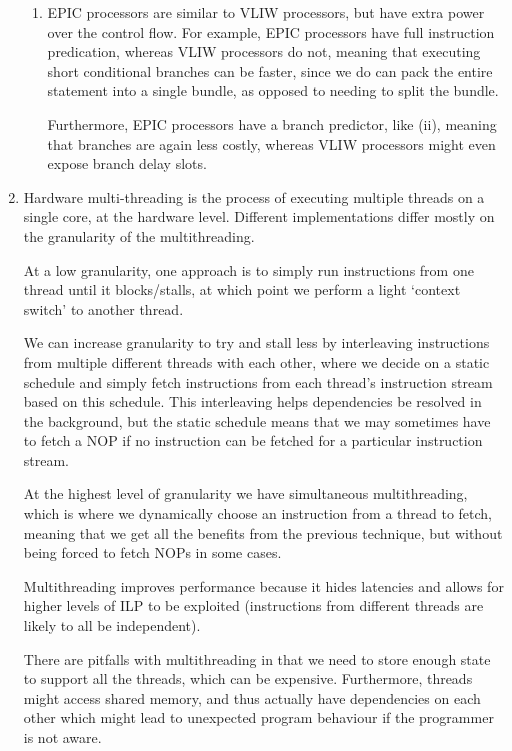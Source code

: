 \begin{enumerate}[label=(\alph*)]
\begin{enumerate}[label=(\roman*)]
            \item
              EPIC processors are similar to VLIW processors, but have extra power over the control flow. For example, EPIC processors have full instruction predication, whereas VLIW processors do not, meaning that executing short conditional branches can be faster, since we do can pack the entire statement into a single bundle, as opposed to needing to split the bundle.

              Furthermore, EPIC processors have a branch predictor, like (ii), meaning that branches are again less costly, whereas VLIW processors might even expose branch delay slots.
    \end{enumerate}

    \item
      Hardware multi-threading is the process of executing multiple threads on a single core, at the hardware level. Different implementations differ mostly on the granularity of the multithreading.

      At a low granularity, one approach is to simply run instructions from one thread until it blocks/stalls, at which point we perform a light `context switch' to another thread.

      We can increase granularity to try and stall less by interleaving instructions from multiple different threads with each other, where we decide on a static schedule and simply fetch instructions from each thread's instruction stream based on this schedule. This interleaving helps dependencies be resolved in the background, but the static schedule means that we may sometimes have to fetch a NOP if no instruction can be fetched for a particular instruction stream.

      At the highest level of granularity we have simultaneous multithreading, which is where we dynamically choose an instruction from a thread to fetch, meaning that we get all the benefits from the previous technique, but without being forced to fetch NOPs in some cases.

      Multithreading improves performance because it hides latencies and allows for higher levels of ILP to be exploited (instructions from different threads are likely to all be independent).

      There are pitfalls with multithreading in that we need to store enough state to support all the threads, which can be expensive. Furthermore, threads might access shared memory, and thus actually have dependencies on each other which might lead to unexpected program behaviour if the programmer is not aware.
        
    \end{enumerate}

